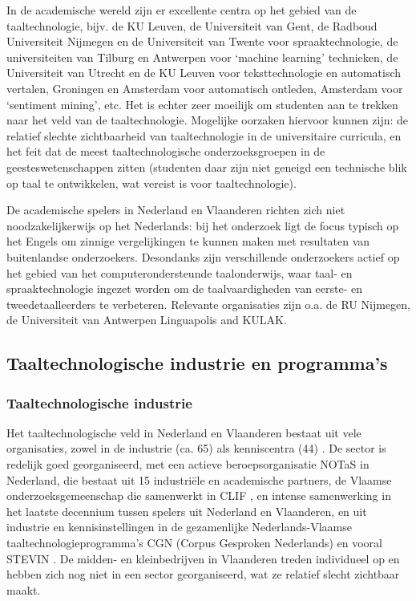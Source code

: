 \documentclass[]{../../metanetpaper}
\begin{document}
\begin{multicols}{2}
    In de academische wereld zijn er excellente centra op het gebied van de taaltechnologie, bijv. de KU Leuven, de Universiteit van Gent, de Radboud Universiteit Nijmegen en de Universiteit van Twente voor spraaktechnologie, de universiteiten van Tilburg en Antwerpen voor `machine learning' technieken, de Universiteit van Utrecht en de KU Leuven voor teksttechnologie en automatisch vertalen, Groningen en Amsterdam voor automatisch ontleden, Amsterdam voor `sentiment mining', etc. Het is echter zeer moeilijk om studenten aan te trekken naar het veld van de taaltechnologie. Mogelijke oorzaken hiervoor kunnen zijn: de relatief slechte zichtbaarheid van taaltechnologie in de universitaire curricula, en het feit dat de meest taaltechnologische onderzoeksgroepen in de geesteswetenschappen zitten (studenten daar zijn niet geneigd een technische blik op taal te ontwikkelen, wat vereist is voor taaltechnologie).

    De academische spelers in Nederland en Vlaanderen richten zich niet noodzakelijkerwijs op het Nederlands: bij het onderzoek ligt de focus typisch op het Engels om zinnige vergelijkingen te kunnen maken met resultaten van buitenlandse onderzoekers. Desondanks zijn verschillende onderzoekers actief op het gebied van het computerondersteunde taalonderwijs, waar taal- en spraaktechnologie ingezet worden om de taalvaardigheden van eerste- en tweedetaalleerders te verbeteren. Relevante organisaties zijn o.a. de RU Nijmegen, de Universiteit van Antwerpen Linguapolis and KULAK.

 \subsection{Taaltechnologische industrie en programma's}

\subsubsection{Taaltechnologische industrie}

 Het taaltechnologische veld in Nederland en Vlaanderen bestaat uit vele organisaties, zowel in de industrie (ca. 65) als kenniscentra (44) \cite{Orgs}.  De sector is redelijk goed georganiseerd, met een actieve beroepsorganisatie NOTaS \cite{NOTAS} in Nederland, die bestaat uit 15 industri{\"e}le en academische partners, de Vlaamse onderzoeksgemeenschap die samenwerkt in CLIF \cite{CLIF}, en intense samenwerking in het laatste decennium tussen spelers uit Nederland en Vlaanderen, en uit industrie en kennisinstellingen in de gezamenlijke Nederlands-Vlaamse taaltechnologieprogramma's CGN (Corpus Gesproken Nederlands) \cite{CGN} en vooral STEVIN \cite{STEVIN}. De midden- en kleinbedrijven in Vlaanderen treden individueel op en hebben zich nog niet in een sector georganiseerd, wat ze relatief slecht zichtbaar maakt.


\end{multicols}
\end{document}
